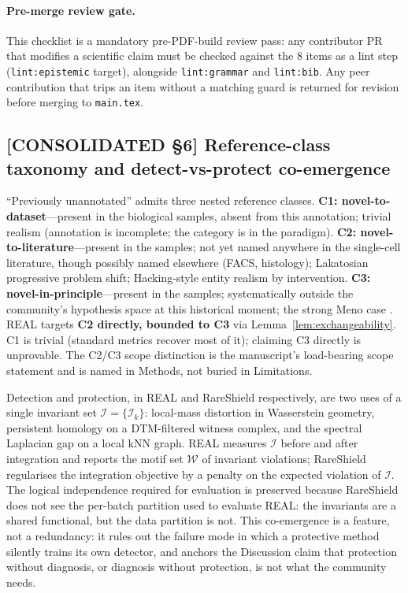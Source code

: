 \paragraph*{Pre-merge review gate.} This checklist is a mandatory pre-PDF-build review pass: any contributor PR that modifies a scientific claim must be checked against the 8 items as a lint step (\texttt{lint:epistemic} target), alongside \texttt{lint:grammar} and \texttt{lint:bib}. Any peer contribution that trips an item without a matching guard is returned for revision before merging to \texttt{main.tex}.

\subsection*{[CONSOLIDATED §6] Reference-class taxonomy and detect-vs-protect co-emergence}
\label{philo:refclass_coemergence}

``Previously unannotated'' admits three nested reference classes. \textbf{C1: novel-to-dataset}---present in the biological samples, absent from this annotation; trivial realism (annotation is incomplete; the category is in the paradigm). \textbf{C2: novel-to-literature}---present in the samples; not yet named anywhere in the single-cell literature, though possibly named elsewhere (FACS, histology); Lakatosian progressive problem shift; Hacking-style entity realism by intervention. \textbf{C3: novel-in-principle}---present in the samples; systematically outside the community's hypothesis space at this historical moment; the strong Meno case \citep{stanford2006}. REAL targets \textbf{C2 directly, bounded to C3} via Lemma~\ref{lem:exchangeability}. C1 is trivial (standard metrics recover most of it); claiming C3 directly is unprovable. The C2/C3 scope distinction is the manuscript's load-bearing scope statement and is named in Methods, not buried in Limitations.

Detection and protection, in REAL and RareShield respectively, are two uses of a single invariant set $\mathcal{I} = \{\mathcal{I}_k\}$: local-mass distortion in Wasserstein geometry, persistent homology on a DTM-filtered witness complex, and the spectral Laplacian gap on a local kNN graph. REAL measures $\mathcal{I}$ before and after integration and reports the motif set $\mathcal{W}$ of invariant violations; RareShield regularises the integration objective by a penalty on the expected violation of $\mathcal{I}$. The logical independence required for evaluation is preserved because RareShield does not see the per-batch partition used to evaluate REAL: the invariants are a shared functional, but the data partition is not. This co-emergence is a feature, not a redundancy: it rules out the failure mode in which a protective method silently trains its own detector, and anchors the Discussion claim that protection without diagnosis, or diagnosis without protection, is not what the community needs.

